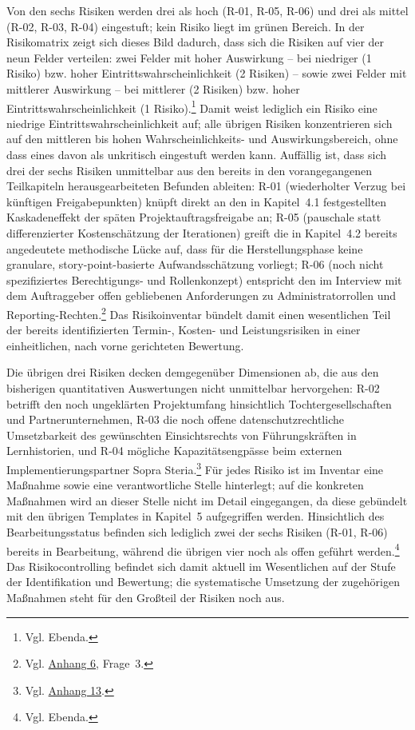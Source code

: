 \documentclass[
    12pt, 
    a4paper,
    ]{scrartcl} %
\begin{document}
Von den sechs Risiken werden drei als hoch (R-01, R-05, R-06) und drei als mittel (R-02, R-03, R-04) eingestuft; kein Risiko liegt im grünen Bereich. In der Risikomatrix zeigt sich dieses Bild dadurch, dass sich die Risiken auf vier der neun Felder verteilen: zwei Felder mit hoher Auswirkung -- bei niedriger (1 Risiko) bzw. hoher Eintrittswahrscheinlichkeit (2 Risiken) -- sowie zwei Felder mit mittlerer Auswirkung -- bei mittlerer (2 Risiken) bzw. hoher Eintrittswahrscheinlichkeit (1 Risiko).\footnote{Vgl. Ebenda.} Damit weist lediglich ein Risiko eine niedrige Eintrittswahrscheinlichkeit auf; alle übrigen Risiken konzentrieren sich auf den mittleren bis hohen Wahrscheinlichkeits- und Auswirkungsbereich, ohne dass eines davon als unkritisch eingestuft werden kann.
Auffällig ist, dass sich drei der sechs Risiken unmittelbar aus den bereits in den vorangegangenen Teilkapiteln herausgearbeiteten Befunden ableiten: R-01 (wiederholter Verzug bei künftigen Freigabepunkten) knüpft direkt an den in Kapitel~4.1 festgestellten Kaskadeneffekt der späten Projektauftragsfreigabe an; R-05 (pauschale statt differenzierter Kostenschätzung der Iterationen) greift die in Kapitel~4.2 bereits angedeutete methodische Lücke auf, dass für die Herstellungsphase keine granulare, story-point-basierte Aufwandsschätzung vorliegt; R-06 (noch nicht spezifiziertes Berechtigungs- und Rollenkonzept) entspricht den im Interview mit dem Auftraggeber offen gebliebenen Anforderungen zu Administratorrollen und Reporting-Rechten.\footnote{Vgl. \hyperref[sec:Anhang6]{Anhang 6}, Frage~3.} Das Risikoinventar bündelt damit einen wesentlichen Teil der bereits identifizierten Termin-, Kosten- und Leistungsrisiken in einer einheitlichen, nach vorne gerichteten Bewertung.

Die übrigen drei Risiken decken demgegenüber Dimensionen ab, die aus den bisherigen quantitativen Auswertungen nicht unmittelbar hervorgehen: R-02 betrifft den noch ungeklärten Projektumfang hinsichtlich Tochtergesellschaften und Partnerunternehmen, R-03 die noch offene datenschutzrechtliche Umsetzbarkeit des gewünschten Einsichtsrechts von Führungskräften in Lernhistorien, und R-04 mögliche Kapazitätsengpässe beim externen Implementierungspartner Sopra Steria.\footnote{Vgl. \hyperref[sec:Anhang13]{Anhang 13}.} Für jedes Risiko ist im Inventar eine Maßnahme sowie eine verantwortliche Stelle hinterlegt; auf die konkreten Maßnahmen wird an dieser Stelle nicht im Detail eingegangen, da diese gebündelt mit den übrigen Templates in Kapitel~5 aufgegriffen werden. Hinsichtlich des Bearbeitungsstatus befinden sich lediglich zwei der sechs Risiken (R-01, R-06) bereits in Bearbeitung, während die übrigen vier noch als offen geführt werden.\footnote{Vgl. Ebenda.} Das Risikocontrolling befindet sich damit aktuell im Wesentlichen auf der Stufe der Identifikation und Bewertung; die systematische Umsetzung der zugehörigen Maßnahmen steht für den Großteil der Risiken noch aus.
\end{document}
